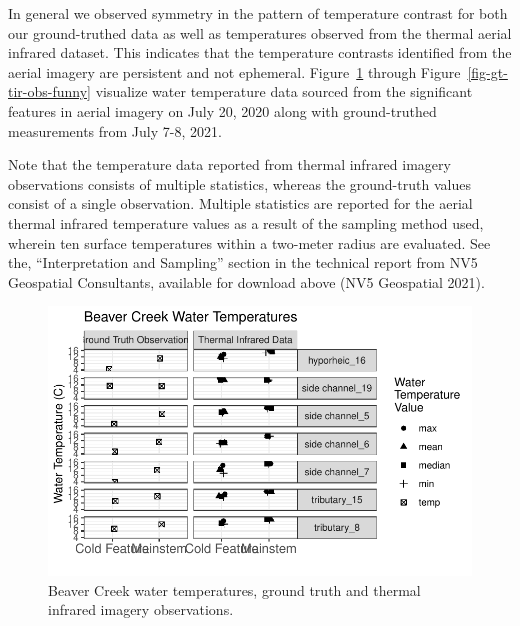 \documentclass[
  letterpaper,
  DIV=11,
  numbers=noendperiod]{scrreprt}
\begin{document}
In general we observed symmetry in the pattern of temperature contrast
for both our ground-truthed data as well as temperatures observed from
the thermal aerial infrared dataset. This indicates that the temperature
contrasts identified from the aerial imagery are persistent and not
ephemeral. Figure~\ref{fig-gt-tir-obs-beaver} through
Figure~\ref{fig-gt-tir-obs-funny} visualize water temperature data
sourced from the significant features in aerial imagery on July 20, 2020
along with ground-truthed measurements from July 7-8, 2021.

Note that the temperature data reported from thermal infrared imagery
observations consists of multiple statistics, whereas the ground-truth
values consist of a single observation. Multiple statistics are reported
for the aerial thermal infrared temperature values as a result of the
sampling method used, wherein ten surface temperatures within a
two-meter radius are evaluated. See the, ``Interpretation and Sampling''
section in the technical report from NV5 Geospatial Consultants,
available for download above (NV5 Geospatial 2021).

\begin{figure}

{\centering \includegraphics{./thermal_imagery_data_files/figure-pdf/fig-gt-tir-obs-beaver-1.pdf}

}

\caption{\label{fig-gt-tir-obs-beaver}Beaver Creek water temperatures,
ground truth and thermal infrared imagery observations.}

\end{figure}
\end{document}
